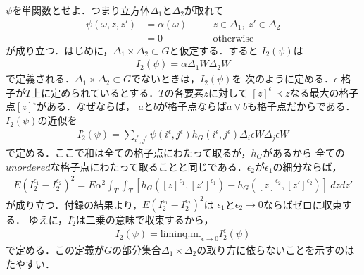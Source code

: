 	$\psi$を単関数とせよ．つまり立方体$\Delta_{1}$と$\Delta_{2}$が取れて
	\begin{align}
		\psi(\omega,z,z') 
		&= \alpha(\omega) \quad && z \in \Delta_{1},\ z' \in \Delta_{2} \\
		&= 0 \quad && \mbox{otherwise}
	\end{align}
	が成り立つ．はじめに，$\Delta_{1} \times \Delta_{2} \subset G$と仮定する．すると
	$I_{2}(\psi)$は
	\begin{align}
		I_{2}(\psi) = \alpha \Delta_{1}W \Delta_{2} W
	\end{align}
	で定義される．$\Delta_{1} \times \Delta_{2} \subset G$でないときは，$I_{2}(\psi)$を
	次のように定める．$\epsilon$-格子が$T$上に定められているとする．$T$の各要素$z$に対して
	$[z]^{\epsilon} \prec z$なる最大の格子点$[z]^{\epsilon}$がある．なぜならば，
	$a$と$b$が格子点ならば$a \vee b$も格子点だからである．$I_{2}(\psi)$の近似を
	\begin{align}
		I^{\epsilon}_{2}(\psi) = \sum_{i^{\epsilon},j^{\epsilon}}
		\psi(i^{\epsilon},j^{\epsilon}) h_{G}(i^{\epsilon},j^{\epsilon})
		\Delta_{i} \epsilon W \Delta_{j} \epsilon W
	\end{align}
	で定める．ここで和は全ての格子点にわたって取るが，$h_{G}$があるから
	全ての$unordered$な格子点にわたって取ることと同じである．$\epsilon_{2}$が$\epsilon_{1}$の細分ならば，
	\begin{align}
		E(I^{\epsilon_{1}}_{2} - I^{\epsilon_{2}}_{2})^{2}
		= E \alpha^{2} \int_{T} \int_{T} \left[
		h_{G}([z]^{\epsilon_{1}}, [z']^{\epsilon_{1}})
		- h_{G}([z]^{\epsilon_{2}}, [z']^{\epsilon_{2}})\right]\ dzdz'
	\end{align}
	が成り立つ．付録の結果より，$E(I^{\epsilon_{1}}_{2} - I^{\epsilon_{2}}_{2})^{2}$は
	$\epsilon_{1}$と$\epsilon_{2} \longrightarrow 0$ならばゼロに収束する．
	ゆえに，$I^{\epsilon}_{2}$は二乗の意味で収束するから，
	\begin{align}
		I_{2}(\psi) = \mathrm{lim in q.m.}_{\epsilon \to 0} I^{\epsilon}_{2}(\psi)
	\end{align}
	で定める．この定義が$G$の部分集合$\Delta_{1} \times \Delta_{2}$の取り方に依らないことを示すのは
	たやすい．
	
